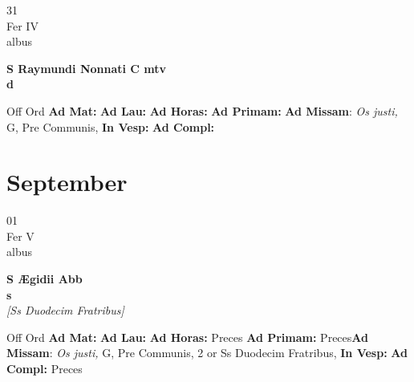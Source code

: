 \documentclass[10pt, openany]{book}
\begin{document}
    \begin{center}
        \begin{minipage}{3.5in}
            \vspace{2em}
            \begin{minipage}{0.5in}
                {\Huge 31} \\
                {\normalsize Fer IV} \\
                {\normalsize albus}
            \end{minipage}
            \begin{minipage}{3.0in}
                \textbf{ \large S Raymundi Nonnati C mtv \\
                \textnormal{\normalsize d}} \\ 
            \end{minipage}
            \begin{justify}Off Ord
                \textbf{Ad Mat: }
                \textbf{Ad Lau: }
                \textbf{Ad Horas: }
                \textbf{Ad Primam: }\textbf{Ad Missam}: \textit{Os justi,} G, Pre Communis,  
                \textbf{In Vesp: }
                \textbf{Ad Compl: }
            \end{justify}
        \end{minipage}
    \end{center}

    \chapter{September}
                    
    \begin{center}
        \begin{minipage}{3.5in}
            \vspace{2em}
            \begin{minipage}{0.5in}
                {\Huge 01} \\
                {\normalsize Fer V} \\
                {\normalsize albus}
            \end{minipage}
            \begin{minipage}{3.0in}
                \textbf{ \large S Ægidii Abb \\
                \textnormal{\normalsize s}} \\ \textit{[Ss Duodecim Fratribus]} \\ 
            \end{minipage}
            \begin{justify}Off Ord
                \textbf{Ad Mat: }
                \textbf{Ad Lau: }
                \textbf{Ad Horas: }Preces
                \textbf{Ad Primam: }Preces\textbf{Ad Missam}: \textit{Os justi,} G, Pre Communis, 2 or Ss Duodecim Fratribus,  
                \textbf{In Vesp: }
                \textbf{Ad Compl: }Preces
            \end{justify}
        \end{minipage}
    \end{center}
\end{document}
